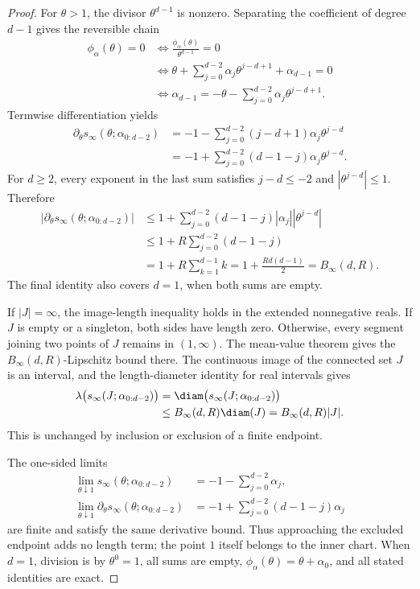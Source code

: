 \begin{proof}
For $\theta>1$, the divisor $\theta^{d-1}$ is nonzero.  Separating the
coefficient of degree $d-1$ gives the reversible chain
\[
\begin{aligned}
\phi_\alpha(\theta)=0
&\Longleftrightarrow \frac{\phi_\alpha(\theta)}{\theta^{d-1}}=0\\
&\Longleftrightarrow
\theta+\sum_{j=0}^{d-2}\alpha_j\theta^{j-d+1}
+\alpha_{d-1}=0\\
&\Longleftrightarrow
\alpha_{d-1}=-\theta-\sum_{j=0}^{d-2}\alpha_j\theta^{j-d+1}.
\end{aligned}
\]
Termwise differentiation yields
\[
\begin{aligned}
\partial_\theta s_\infty(\theta;\alpha_{0:d-2})
&=-1-\sum_{j=0}^{d-2}(j-d+1)\alpha_j\theta^{j-d}\\
&=-1+\sum_{j=0}^{d-2}(d-1-j)\alpha_j\theta^{j-d}.
\end{aligned}
\]
For $d\geq2$, every exponent in the last sum satisfies $j-d\leq-2$ and
$|\theta^{j-d}|\leq1$.  Therefore
\[
\begin{aligned}
|\partial_\theta s_\infty(\theta;\alpha_{0:d-2})|
&\leq1+\sum_{j=0}^{d-2}(d-1-j)|\alpha_j||\theta^{j-d}|\\
&\leq1+R\sum_{j=0}^{d-2}(d-1-j)\\
&=1+R\sum_{k=1}^{d-1}k
=1+\frac{Rd(d-1)}2=B_\infty(d,R).
\end{aligned}
\]
The final identity also covers $d=1$, when both sums are empty.

If $|J|=\infty$, the image-length inequality holds in the extended
nonnegative reals.  If $J$ is empty or a singleton, both sides have length
zero.  Otherwise, every segment joining two points of $J$ remains in
$(1,\infty)$.  The mean-value theorem gives the
$B_\infty(d,R)$-Lipschitz bound there.  The continuous image of the connected
set $J$ is an interval, and the length-diameter identity for real intervals
gives
\[
\begin{aligned}
\lambda\bigl(s_\infty(J;\alpha_{0:d-2})\bigr)
&=\diam\bigl(s_\infty(J;\alpha_{0:d-2})\bigr)\\
&\leq B_\infty(d,R)\diam(J)
=B_\infty(d,R)|J|.
\end{aligned}
\]
This is unchanged by inclusion or exclusion of a finite endpoint.

The one-sided limits
\[
\begin{aligned}
\lim_{\theta\downarrow1}s_\infty(\theta;\alpha_{0:d-2})
&=-1-\sum_{j=0}^{d-2}\alpha_j,\\
\lim_{\theta\downarrow1}\partial_\theta s_\infty(\theta;\alpha_{0:d-2})
&=-1+\sum_{j=0}^{d-2}(d-1-j)\alpha_j
\end{aligned}
\]
are finite and satisfy the same derivative bound.  Thus approaching the
excluded endpoint adds no length term; the point $1$ itself belongs to the
inner chart.  When $d=1$, division is by $\theta^0=1$, all sums are empty,
$\phi_\alpha(\theta)=\theta+\alpha_0$, and all stated identities are exact.
\end{proof}

